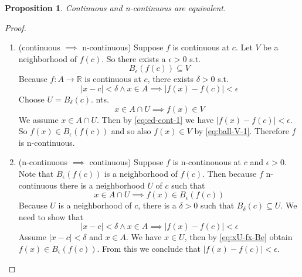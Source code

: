 \documentclass{article}
\newtheorem{proposition}[theorem]{Proposition}
\newcommand{\Reals}[0]{\mathbb{R}}
\begin{document}
\begin{proposition}
  Continuous and n-continuous are equivalent.
\end{proposition}
\begin{proof}\ 
   \begin{enumerate}
   \item (continuous $\implies$ n-continuous)
     Suppose $f$ is continuous at $c$.
     Let $V$ be a neighborhood of $f(c)$.
     So there exists a $\epsilon > 0$ s.t. 
     \begin{equation} \label{eq:ball-V-1}
     B_\epsilon(f(c)) \subseteq V
     \end{equation}
     Because $f : A \to \Reals$ is continuous at $c$, 
     there exists $\delta > 0$ s.t.
     \begin{equation} \label{eq:ed-cont-1}
     |x - c| < \delta \land x \in A \implies |f(x) - f(c)| < \epsilon
     \end{equation}
     Choose $U=B_\delta(c)$. nts. 
     \[
     x \in A \cap U \implies f(x) \in V
     \]
     We assume $x \in A \cap U$. Then by \eqref{eq:ed-cont-1} we have
     $|f(x) - f(c)| < \epsilon$. So $f(x) \in B_\epsilon(f(c))$
     and so also $f(x) \in V$ by \eqref{eq:ball-V-1}.
     Therefore $f$ is n-continuous.

   \item (n-continuous $\implies$ continuous) Suppose $f$ is
     n-continouous at $c$ and $\epsilon > 0$. Note that
     $B_\epsilon(f(c))$ is a neighborhood of $f(c)$. Then because $f$
     n-continuous there is a neighborhood $U$ of $c$ such that
     \begin{equation}\label{eq:xU-fx-Be}
       x \in A \cap U \implies f(x) \in B_\epsilon(f(c))
     \end{equation}
     Because $U$ is a neighborhood of $c$, there is a $\delta > 0$
     such that $B_\delta(c) \subseteq U$. We need to show that
     \[
     |x - c| < \delta \land x \in A \implies |f(x) - f(c)| < \epsilon
     \]
     Assume $|x - c| < \delta$ and $x \in A$.
     We have $x \in U$, then by \eqref{eq:xU-fx-Be} obtain
     $f(x) \in B_\epsilon(f(c))$. From this we conclude that
     $|f(x) - f(c)| < \epsilon$.

   \end{enumerate}
\end{proof}
\end{document}

